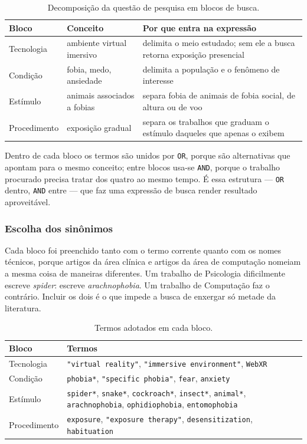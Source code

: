\begin{table}[htbp]
\centering
\caption{Decomposição da questão de pesquisa em blocos de busca.}
\label{tab:blocos}
\small
\begin{tabular}{p{2.4cm}p{3.6cm}p{5.4cm}}
\toprule
\textbf{Bloco} & \textbf{Conceito} & \textbf{Por que entra na expressão} \\
\midrule
Tecnologia & ambiente virtual imersivo &
delimita o meio estudado; sem ele a busca retorna exposição presencial \\
Condição & fobia, medo, ansiedade &
delimita a população e o fenômeno de interesse \\
Estímulo & animais associados a fobias &
separa fobia de animais de fobia social, de altura ou de voo \\
Procedimento & exposição gradual &
separa os trabalhos que graduam o estímulo daqueles que apenas o exibem \\
\bottomrule
\end{tabular}
\end{table}

Dentro de cada bloco os termos são unidos por \texttt{OR}, porque são
alternativas que apontam para o mesmo conceito; entre blocos usa-se
\texttt{AND}, porque o trabalho procurado precisa tratar dos quatro ao
mesmo tempo. É essa estrutura --- \texttt{OR} dentro, \texttt{AND} entre
--- que faz uma expressão de busca render resultado aproveitável.

\subsubsection{Escolha dos sinônimos}

Cada bloco foi preenchido tanto com o termo corrente quanto com os nomes
técnicos, porque artigos da área clínica e artigos da área de computação
nomeiam a mesma coisa de maneiras diferentes. Um trabalho de Psicologia
dificilmente escreve \textit{spider}: escreve
\textit{arachnophobia}. Um trabalho de Computação faz o contrário.
Incluir os dois é o que impede a busca de enxergar só metade da
literatura.

\begin{table}[htbp]
\centering
\caption{Termos adotados em cada bloco.}
\label{tab:termos}
\small
\begin{tabular}{p{2.5cm}>{\raggedright\arraybackslash}p{9.3cm}}
\toprule
\textbf{Bloco} & \textbf{Termos} \\
\midrule
Tecnologia &
\texttt{"virtual reality"}, \texttt{"immersive environment"},
\texttt{WebXR} \\
Condição &
\texttt{phobia*}, \texttt{"specific phobia"}, \texttt{fear},
\texttt{anxiety} \\
Estímulo &
\texttt{spider*}, \texttt{snake*}, \texttt{cockroach*},
\texttt{insect*}, \texttt{animal*}, \texttt{arachnophobia},
\texttt{ophidiophobia}, \texttt{entomophobia} \\
Procedimento &
\texttt{exposure}, \texttt{"exposure therapy"},
\texttt{desensitization}, \texttt{habituation} \\
\bottomrule
\end{tabular}
\end{table}


